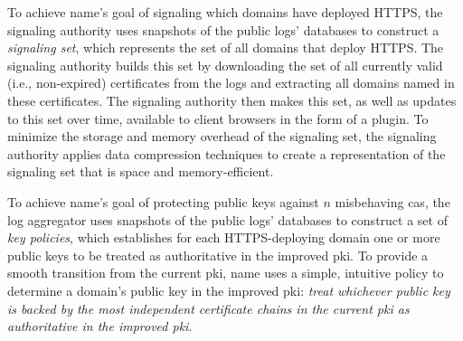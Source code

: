 To achieve \ac{name}'s goal of signaling which domains have deployed HTTPS, the
signaling authority uses snapshots of the public logs' databases to construct a
\emph{signaling set}, which represents the set of all domains that deploy HTTPS.
The signaling authority builds this set by downloading the set of all currently
valid (i.e., non-expired) certificates from the logs and extracting all domains
named in these certificates. The signaling authority then makes this set, as
well as updates to this set over time, available to client browsers in the form
of a plugin. To minimize the storage and memory overhead of the signaling set,
the signaling authority applies data compression techniques to create a
representation of the signaling set that is space and memory-efficient.

To achieve \ac{name}'s goal of protecting public keys against $n$ misbehaving
\acp{ca}, the log aggregator uses snapshots of the public logs' databases to
construct a set of \emph{key policies}, which establishes for each
HTTPS-deploying domain one or more public keys to be treated as authoritative in
the improved \ac{pki}. To provide a smooth transition from the current \ac{pki},
\ac{name} uses a simple, intuitive policy to determine a domain's public key in
the improved \ac{pki}: \emph{treat whichever public key is backed by the most
  independent certificate chains in the current
\ac{pki} as authoritative in the improved \ac{pki}}.




